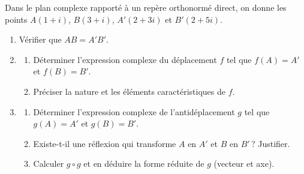 \begin{exo}\label{exo:isom-deux-points}
      Dans le plan complexe rapporté à un repère orthonormé direct, on donne les points
      $A(1+i)$, $B(3+i)$, $A'(2+3i)$ et $B'(2+5i)$.
      \begin{enumerate}
            \item Vérifier que $AB = A'B'$.
            \item \begin{enumerate}
                        \item Déterminer l'expression complexe du déplacement $f$ tel que $f(A) = A'$ et $f(B) = B'$.
                        \item Préciser la nature et les éléments caractéristiques de $f$.
                  \end{enumerate}
            \item \begin{enumerate}
                        \item Déterminer l'expression complexe de l'antidéplacement $g$ tel que $g(A) = A'$ et $g(B) = B'$.
                        \item Existe-t-il une réflexion qui transforme $A$ en $A'$ et $B$ en $B'$\,? Justifier.
                        \item Calculer $g \circ g$ et en déduire la forme réduite de $g$ (vecteur et axe).
                  \end{enumerate}
      \end{enumerate}
\end{exo}
